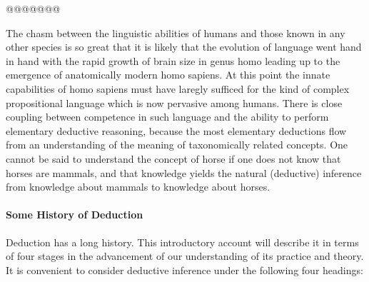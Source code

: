 \documentclass[10pt,titlepage]{book}
\begin{document}
{@@@@@@@

The chasm between the linguistic abilities of humans and those known in any other species is so great that it is likely that the evolution of language went hand in hand with the rapid growth of brain size in genus homo leading up to the emergence of anatomically modern homo sapiens.
At this point the innate capabilities of homo sapiens must have laregly sufficed for the kind of complex propositional language which is now pervasive among humans.
There is close coupling between competence in such language and the ability to perform elementary deductive reasoning, because the most elementary deductions flow from an understanding of the meaning of taxonomically related concepts.
One cannot be said to understand the concept of horse if one does not know that horses are mammals, and that knowledge yields the natural (deductive) inference from knowledge about mammals to knowledge about horses.

}

\paragraph{Some History of Deduction}

Deduction has a long history.
This introductory account will describe it in terms of four stages in the advancement of our understanding of its practice and theory.
It is convenient to consider deductive inference under the following four headings:
\end{document}
